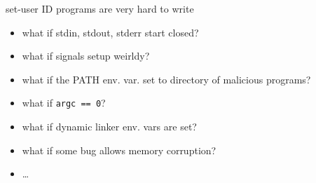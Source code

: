 \begin{frame}{set-user ID programs are very hard to write}
\begin{itemize}
\item what if stdin, stdout, stderr start closed?
\item what if signals setup weirldy?
\item what if the PATH env. var. set to directory of malicious programs?
\item what if \texttt{argc == 0}?
\item what if dynamic linker env. vars are set?
\item what if some bug allows memory corruption?
\item \ldots
\end{itemize}
\end{frame}

